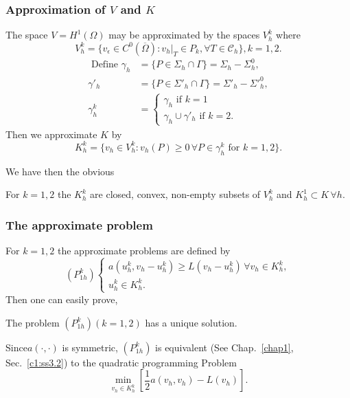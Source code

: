 \subsubsection{Approximation of  $V$ and $K$}\label{c2:sss4.4.1} 

The space $V=H^1(\Omega)$ may be approximated by the spaces $V^k_h$ where  
$$
V^k_h = \{v_\epsilon \in C^0 (\overline{\Omega}) : v_h |_T \in P_k,
\forall T \in \mathscr{C}_h \}, k=1, 2. 
$$
\begin{align*}
\text{ Define } \gamma_h & = \{P \in \Sigma_h \cap \Gamma \} =
\Sigma_h - \Sigma^0_h,\\ 
\gamma'_h & = \{P \in \Sigma'_h \cap \Gamma \} = \Sigma'_h -
\Sigma'^0_h,\\ 
\gamma^k_h& = \begin{cases}\gamma_h \text{ if } k=1\\ 
\gamma_h \cup \gamma'_h \text{ if } k=2 .
\end{cases}
\end{align*}
Then we approximate $K$ by 
$$
K^k_h = \{v_h \in V^k_h:v_h (P) \geq 0 \, \forall  P \in
\gamma^k_h \text{ for } k=1, 2\} . 
$$

We have then the obvious 

\begin{proposition}\label{c2:prop4.2}%
For $k=1, 2$ the $K^k_h$ are closed, convex, non-empty subsets of
$V^{k}_h$ and $K^{1}_h\subset K\, \forall  h$. 
\end{proposition}

\subsubsection{The approximate problem}\label{c2:sss4.4.2} 

For $k=1, 2$ the approximate
problems are defined by  
\begin{equation*}
(P^k_{1h})
\begin{cases}
a(u^k_h, v_h-u^k_h) \geq L(v_h-u^k_h)\, \forall  v_h \in K^k_h, \\
u^k_h \in K^k_h.
\end{cases}
\end{equation*}
Then one can easily prove, 

\begin{proposition}\label{c2:prop4.3}%
The problem $(P^k_{1h}) (k=1, 2)$ has a unique solution.
\end{proposition}

\begin{remark}\label{c2:rem4.6}%
Since\pageoriginale  $a(\cdot, \cdot)$ is symmetric, $(P^k_{1h})$ is
equivalent (See \break  
Chap.~\ref{chap1}, Sec.~\ref{c1:ss3.2}) to the quadratic programming
Problem  
$$
\min_{v_h \in K^k_h} \left[\frac{1}{2} a (v_h, v_h) -L (v_h)\right]. 
$$
\end{remark}

